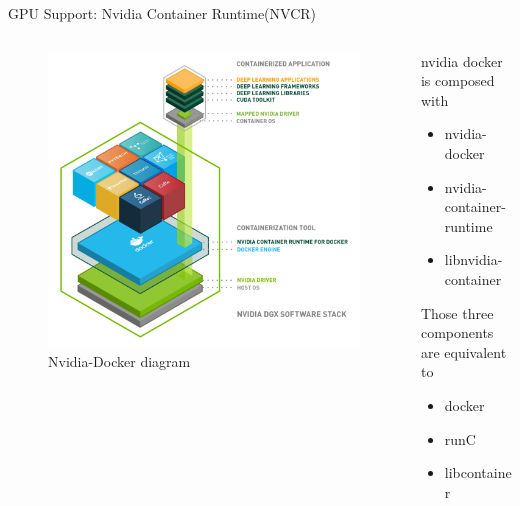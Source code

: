 \begin{frame}{GPU Support: Nvidia Container Runtime(NVCR)}
    \begin{columns}
        \begin{column}{0.7\textwidth}
            \begin{figure}
                \includegraphics[width=1\textwidth]{assets/dgx-docker-1024x970.png}
                \caption{Nvidia-Docker diagram}
            \end{figure}
        \end{column}
        \begin{column}{0.5\textwidth}
            \pause
            nvidia docker is composed with 
            \begin{itemize}
                \item nvidia-docker 
                \item nvidia-container-runtime
                \item libnvidia-container
            \end{itemize}

            \pause
            Those three components are equivalent to

            \begin{itemize}
                \item docker
                \item runC
                \item libcontainer
            \end{itemize}


        \end{column}
    \end{columns}
\end{frame}